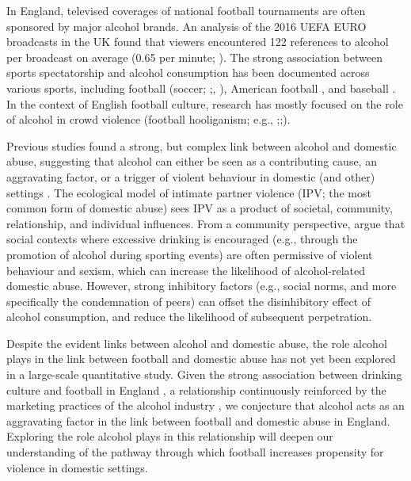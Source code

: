 \documentclass[12pt, a4paper]{article}
\begin{document}
In England, televised coverages of national football tournaments are often sponsored by major alcohol brands. An analysis of the 2016 UEFA EURO broadcasts in the UK found that viewers encountered 122 references to alcohol per broadcast on average (0.65 per minute; ). The strong association between sports spectatorship and alcohol consumption has been documented across various sports, including football (soccer; ;, ), American football \cite{Glassman2011}, and baseball \cite{Erickson2011}. In the context of English football culture, research has mostly focused on the role of alcohol in crowd violence (football hooliganism; e.g., ;;). 

Previous studies found a strong, but complex link between alcohol and domestic abuse, suggesting that alcohol can either be seen as a contributing cause, an aggravating factor, or a trigger of violent behaviour in domestic (and other) settings \cite{Leonard2017}. The ecological model of intimate partner violence (IPV; the most common form of domestic abuse) sees IPV as a product of societal, community, relationship, and individual influences. From a community perspective,  argue that social contexts where excessive drinking is encouraged (e.g., through the promotion of alcohol during sporting events) are often permissive of violent behaviour and sexism, which can increase the likelihood of alcohol-related domestic abuse. However, strong inhibitory factors (e.g., social norms, and more specifically the condemnation of peers) can offset the disinhibitory effect of alcohol consumption, and reduce the likelihood of subsequent perpetration.  



Despite the evident links between alcohol and domestic abuse, the role alcohol plays in the link between football and domestic abuse has not yet been explored in a large-scale quantitative study. Given the strong association between drinking culture and football in England \cite{Dixon2014}, a relationship continuously reinforced by the marketing practices of the alcohol industry \cite{Gornall2014}, we conjecture that alcohol acts as an aggravating factor in the link between football and domestic abuse in England. Exploring the role alcohol plays in this relationship will deepen our understanding of the pathway through which football increases propensity for violence in domestic settings.
\end{document}
